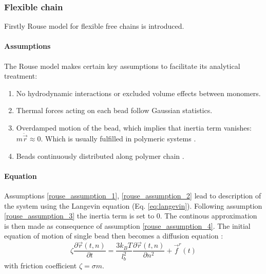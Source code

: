 \documentclass[
    paper=A4,pagesize=automedia,fontsize=12pt,
    BCOR=15mm,DIV=22,
    twoside,headinclude,footinclude=false,
    fleqn,             %
    bibliography=totocnumbered,          %
    listof=totoc,                %
    listof=flat,                 %
    cleardoublepage=empty      %
    numbers=endperiod
]{scrartcl}
\begin{document}
\subsubsection{Flexible chain} \label{sec:rouse_flexible_chain}
Firstly Rouse model for flexible free chains is introduced.
\paragraph{Assumptions}
The Rouse model makes certain key assumptions to facilitate its analytical treatment:
\begin{enumerate}
    \item \label{rouse_assumption_1} No hydrodynamic interactions or excluded volume effects between monomers.
    \item \label{rouse_assumption_2} Thermal forces acting on each bead follow Gaussian statistics.
    \item \label{rouse_assumption_3} Overdamped motion of the bead, which implies that inertia term vanishes: $m \ddot{\vec{r}} \approx 0$.
    Which is usually fulfilled in polymeric systems \cite{Doi_Intro_PP:2005}.
    \item \label{rouse_assumption_4} Beads continuously distributed along polymer chain \cite{Doi_Edwards_PD:1994}.
\end{enumerate}

\paragraph{Equation}
Assumptions \ref{rouse_assumption_1}, \ref{rouse_assumption_2} lead to description of the
system using the Langevin equation (Eq. \ref{eq:langevin}). Following assumption \ref{rouse_assumption_3} 
the inertia term is set to 0. The continous approximation is then made as consequence of assumption \ref{rouse_assumption_4}.
The initial equation of motion of single bead then becomes a diffusion equation \cite{Rub_Colby_PolyPhy:2005}:
\begin{equation}
    \label{eq:diffusion}
    \zeta \frac{\partial \vec{r}(t,n)}{\partial t} = \frac{3 k_B T}{l_b^2} \frac{\partial \vec{r}(t,n)}{\partial n^2} + \vec{f}^r(t)
\end{equation}
with friction coefficient $\zeta = \sigma m$.
\end{document}
